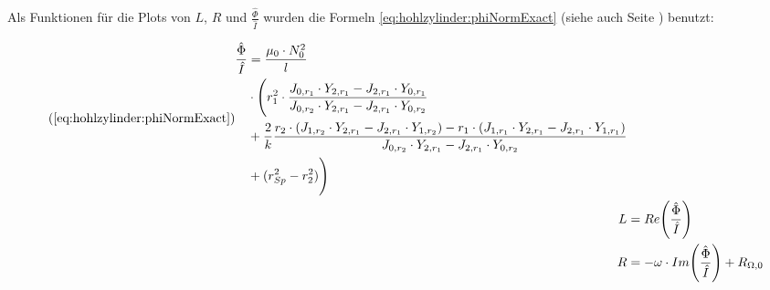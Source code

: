 Als Funktionen f\"ur  die Plots von $L$,  $R$ und $\frac{\hat{\Phi}}{\hat{I}}$
wurden  die  Formeln   \ref{eq:hohlzylinder:phiNormExact}  (siehe  auch  Seite
\pageref{eq:hohlzylinder:phiNormExact}) benutzt:

\begin{align*}
    \tag{\ref{eq:hohlzylinder:phiNormExact}}
    \begin{split}
    \frac{\hat{\Phi}}{\hat{I}} & = \frac{\mu_0 \cdot N_0^2}{l} \\
                               & \cdot \Biggl( r_1^2 \cdot \frac{J_{0,r_1} \cdot Y_{2,r_1} - J_{2,r_1} \cdot Y_{0,r_1}}{J_{0,r_2} \cdot Y_{2,r_1} - J_{2,r_1} \cdot Y_{0,r_2}} \\
                               & + \frac{2}{k} \frac{r_2 \cdot (J_{1,r_2} \cdot Y_{2,r_1} - J_{2,r_1} \cdot Y_{1,r_2}) - r_1 \cdot (J_{1,r_1} \cdot Y_{2,r_1} - J_{2,r_1} \cdot Y_{1,r_1})}{J_{0,r_2} \cdot Y_{2,r_1} - J_{2,r_1} \cdot Y_{0,r_2}} \\
                               & + (r_{Sp}^2 - r_2^2) \Biggr)
    \end{split} \\
    L & = Re \Biggl(\frac{\hat{\Phi}}{\hat{I}} \Biggr) \\
    R & = - \omega \cdot Im \Biggl(\frac{\hat{\Phi}}{\hat{I}} \Biggr) + R_{\Omega,0}
\end{align*}

\begin{figure}[h!]
    \resizebox{\textwidth}{!}{}
\end{figure}

\begin{figure}[h!]
    \resizebox{\textwidth}{!}{}
\end{figure}

\begin{figure}[h!]
    \resizebox{\textwidth}{!}{}
\end{figure}

